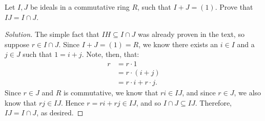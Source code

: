 \documentclass[12pt]{article}
\newenvironment{problem}[2][Problem]{\begin{trivlist}
\item[\hskip \labelsep {\bfseries #1}\hskip \labelsep {\bfseries #2.}]}{\end{trivlist}}
\newenvironment{solution}
  {\renewcommand\qedsymbol{$\blacksquare$}\begin{proof}[Solution]}
{\end{proof}}
\theoremstyle{remark}
\begin{document}
\begin{problem}{4.5}
  Let $I,J$ be ideals in a commutative ring $R$, such that $I+J=(1)$.
  Prove that $IJ=I\cap J$.
\end{problem}
\begin{solution}
  The simple fact that $IH\subseteq I\cap J$ was already proven in the text, so suppose
  $r\in I\cap J$.
  Since $I+J=(1)=R$, we know there exists an $i\in I$ and a $j\in J$ such that $1=i+j$.
  Note, then, that:
  \begin{align*}
    r &= r\cdot1 \\
    &= r\cdot(i+j) \\
    &= r\cdot i + r\cdot j.
  \end{align*}
  Since $r\in J$ and $R$ is commutative, we know that $ri\in IJ$, and since $r\in J$, we also know that
  $rj\in IJ$.
  Hence $r=ri+rj\in IJ$, and so $I\cap J\subseteq IJ$.
  Therefore, $IJ=I\cap J$, as desired.
\end{solution}<++>
\end{document}
